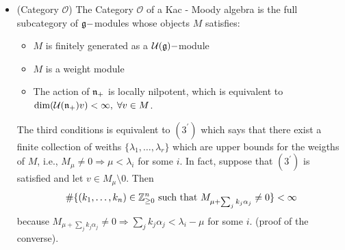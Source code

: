 \begin{itemize}
    \item(Category $\mathcal{O}$)
    The Category $\mathcal{O}$ of a Kac - Moody algebra is the full subcategory of $\mathfrak{g}-$modules whose objects $M$ satisfies:
    \begin{itemize}
        \item[(1)] $M$ is finitely generated as a $\mathcal{U}(\mathfrak{g})-$module
        \item[(2)] $M$ is a weight module 
        \item[(3)] The action of $\mathfrak{n}_+$ is locally nilpotent, which is equivalent to 
        $\dim(\mathcal{U}(\mathfrak{n}_+)v) <\infty,\;\forall v\in M$.
    \end{itemize}
    The third conditions is equivalent to $(3^\prime)$ which says that there exist a finite collection of weiths 
    $\{\lambda_1,\dots,\lambda_r\}$ which are upper bounds for the weigths of $M$, i.e., $M_\mu\neq0\Rightarrow \mu<\lambda_i$ 
    for some $i$. In fact, suppose that $(3^\prime)$ is satisfied and let $v\in M_\mu\setminus0$. Then 
    \begin{equation}
        \#\{(k_1,\dots,k_n)\in\mathbb{Z}_{\geq0}^n\text{ such that }M_{\mu +\sum_jk_j\alpha_j}\neq0\}<\infty
    \end{equation}
    because $M_{\mu +\sum_jk_j\alpha_j}\neq0\Rightarrow \sum_jk_j\alpha_j < \lambda_i-\mu$ for some $i$. 
    (\TODO proof of the converse).\par 


\end{itemize}

